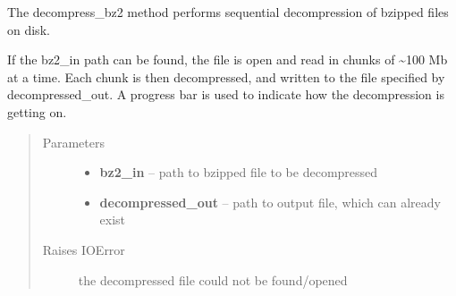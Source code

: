 \documentclass[letterpaper,10pt,english]{sphinxmanual}
\begin{document}
\begin{fulllineitems}
\label{conversion:conversion.decompress_bz2}
The decompress\_bz2 method performs sequential decompression of bzipped files on disk.

If the bz2\_in path can be found, the file is open and read in chunks of \textasciitilde{}100 Mb at a time. Each chunk is then
decompressed, and written to the file specified by decompressed\_out. A progress bar is used to indicate how the
decompression is getting on.
\begin{quote}\begin{description}
\item[{Parameters}] \leavevmode\begin{itemize}
\item {} 
\textbf{bz2\_in} -- path to bzipped file to be decompressed

\item {} 
\textbf{decompressed\_out} -- path to output file, which can already exist

\end{itemize}

\item[{Raises IOError}] \leavevmode
the decompressed file could not be found/opened

\end{description}\end{quote}

\end{fulllineitems}

\end{document}
